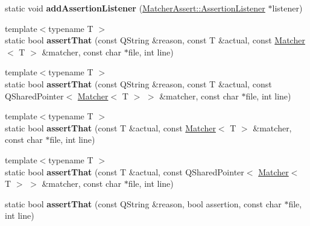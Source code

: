 \begin{DoxyCompactItemize}
\item 
\hypertarget{class_hamcrest_qt_1_1_matcher_assert_aa6ff8e92bdf99e18e23cc52d568f6b35}{static void {\bfseries add\-Assertion\-Listener} (\hyperlink{class_hamcrest_qt_1_1_matcher_assert_1_1_assertion_listener}{Matcher\-Assert\-::\-Assertion\-Listener} $\ast$listener)}\label{class_hamcrest_qt_1_1_matcher_assert_aa6ff8e92bdf99e18e23cc52d568f6b35}

\item 
\hypertarget{class_hamcrest_qt_1_1_matcher_assert_a7ad3b92fda708cc204b3f0e970e220f7}{{\footnotesize template$<$typename T $>$ }\\static bool {\bfseries assert\-That} (const Q\-String \&reason, const T \&actual, const \hyperlink{class_hamcrest_qt_1_1_matcher}{Matcher}$<$ T $>$ \&matcher, const char $\ast$file, int line)}\label{class_hamcrest_qt_1_1_matcher_assert_a7ad3b92fda708cc204b3f0e970e220f7}

\item 
\hypertarget{class_hamcrest_qt_1_1_matcher_assert_aa119900c04bc1e5a86eb39cd73b1ee71}{{\footnotesize template$<$typename T $>$ }\\static bool {\bfseries assert\-That} (const Q\-String \&reason, const T \&actual, const Q\-Shared\-Pointer$<$ \hyperlink{class_hamcrest_qt_1_1_matcher}{Matcher}$<$ T $>$ $>$ \&matcher, const char $\ast$file, int line)}\label{class_hamcrest_qt_1_1_matcher_assert_aa119900c04bc1e5a86eb39cd73b1ee71}

\item 
\hypertarget{class_hamcrest_qt_1_1_matcher_assert_a93a079826e57ef96fb16625d31037572}{{\footnotesize template$<$typename T $>$ }\\static bool {\bfseries assert\-That} (const T \&actual, const \hyperlink{class_hamcrest_qt_1_1_matcher}{Matcher}$<$ T $>$ \&matcher, const char $\ast$file, int line)}\label{class_hamcrest_qt_1_1_matcher_assert_a93a079826e57ef96fb16625d31037572}

\item 
\hypertarget{class_hamcrest_qt_1_1_matcher_assert_a9e72dd2dcc8e0f7ad9f225571b4dbed8}{{\footnotesize template$<$typename T $>$ }\\static bool {\bfseries assert\-That} (const T \&actual, const Q\-Shared\-Pointer$<$ \hyperlink{class_hamcrest_qt_1_1_matcher}{Matcher}$<$ T $>$ $>$ \&matcher, const char $\ast$file, int line)}\label{class_hamcrest_qt_1_1_matcher_assert_a9e72dd2dcc8e0f7ad9f225571b4dbed8}

\item 
\hypertarget{class_hamcrest_qt_1_1_matcher_assert_a29694b80b62cf2d2a71c56ba37398f19}{static bool {\bfseries assert\-That} (const Q\-String \&reason, bool assertion, const char $\ast$file, int line)}\label{class_hamcrest_qt_1_1_matcher_assert_a29694b80b62cf2d2a71c56ba37398f19}

\end{DoxyCompactItemize}


